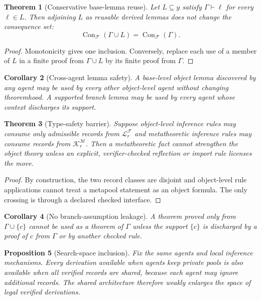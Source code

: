 \documentclass[11pt]{article}
\newtheorem{theorem}{Theorem}[section]
\newtheorem{proposition}[theorem]{Proposition}
\newtheorem{corollary}[theorem]{Corollary}
\theoremstyle{definition}
\theoremstyle{remark}
\newcommand{\Con}{\operatorname{Con}}
\newcommand{\Pool}{\mathcal L}
\newcommand{\MetaPool}{\mathcal K}
\newcommand{\M}{\mathcal M}
\newcommand{\F}{\mathcal F}
\newcommand{\Gammaa}{\Gamma}
\begin{document}
\begin{theorem}[Conservative base-lemma reuse]
Let $L\subseteq y$ satisfy $\Gammaa\vdash\ell$ for every $\ell\in L$. Then adjoining $L$ as reusable derived lemmas does not change the consequence set:
\[
\Con_{\F}(\Gammaa\cup L)=\Con_{\F}(\Gammaa).
\]
\end{theorem}

\begin{proof}
Monotonicity gives one inclusion. Conversely, replace each use of a member of $L$ in a finite proof from $\Gammaa\cup L$ by its finite proof from $\Gammaa$.
\end{proof}

\begin{corollary}[Cross-agent lemma safety]
A base-level object lemma discovered by any agent may be used by every other object-level agent without changing theoremhood. A supported branch lemma may be used by every agent whose context discharges its support.
\end{corollary}

\begin{theorem}[Type-safety barrier]
Suppose object-level inference rules may consume only admissible records from $\Pool_r^{\F}$ and metatheoretic inference rules may consume records from $\MetaPool_r^{\M}$. Then a metatheoretic fact cannot strengthen the object theory unless an explicit, verifier-checked reflection or import rule licenses the move.
\end{theorem}

\begin{proof}
By construction, the two record classes are disjoint and object-level rule applications cannot treat a metapool statement as an object formula. The only crossing is through a declared checked interface.
\end{proof}

\begin{corollary}[No branch-assumption leakage]
A theorem proved only from $\Gammaa\cup\{c\}$ cannot be used as a theorem of $\Gammaa$ unless the support $\{c\}$ is discharged by a proof of $c$ from $\Gammaa$ or by another checked rule.
\end{corollary}

\begin{proposition}[Search-space inclusion]
Fix the same agents and local inference mechanisms. Every derivation available when agents keep private pools is also available when all verified records are shared, because each agent may ignore additional records. The shared architecture therefore weakly enlarges the space of legal verified derivations.
\end{proposition}
\end{document}
